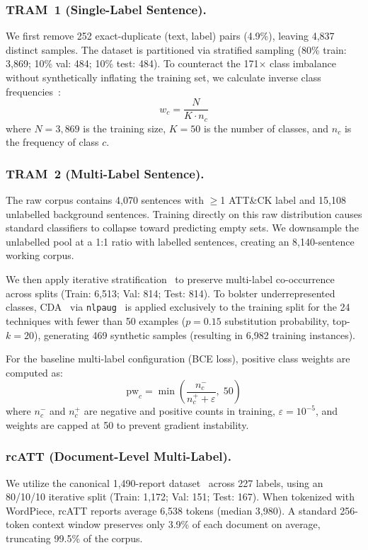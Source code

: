 \documentclass[runningheads]{llncs}
\begin{document}
\subsubsection{TRAM~1 (Single-Label Sentence).}
We first remove 252 exact-duplicate (text, label) pairs (4.9\%), leaving 4,837 distinct samples. The dataset is partitioned via stratified sampling (80\% train: 3,869; 10\% val: 484; 10\% test: 484). To counteract the 171$\times$ class imbalance without synthetically inflating the training set, we calculate inverse class frequencies~\cite{sklearn2011}:
\begin{equation}
  w_c = \frac{N}{K \cdot n_c}
  \label{eq:cw}
\end{equation}
where $N=3,869$ is the training size, $K=50$ is the number of classes, and $n_c$ is the frequency of class $c$.

\subsubsection{TRAM~2 (Multi-Label Sentence).}
The raw corpus contains 4,070 sentences with $\geq$1 ATT\&CK label and 15,108 unlabelled background sentences. Training directly on this raw distribution causes standard classifiers to collapse toward predicting empty sets. We downsample the unlabelled pool at a 1:1 ratio with labelled sentences, creating an 8,140-sentence working corpus. 

We then apply iterative stratification~\cite{sechidis2011} to preserve multi-label co-occurrence across splits (Train: 6,513; Val: 814; Test: 814). To bolster underrepresented classes, CDA~\cite{kobayashi2018contextual} via \texttt{nlpaug}~\cite{ma2019nlpaug} is applied exclusively to the training split for the 24 techniques with fewer than 50 examples ($p=0.15$ substitution probability, top-$k=20$), generating 469 synthetic samples (resulting in 6,982 training instances).

For the baseline multi-label configuration (BCE loss), positive class weights are computed as:
\begin{equation}
  \mathrm{pw}_c = \min\!\left(\frac{n_c^{-}}{n_c^{+} + \varepsilon},\; 50\right)
  \label{eq:pw}
\end{equation}
where $n_c^{-}$ and $n_c^{+}$ are negative and positive counts in training, $\varepsilon=10^{-5}$, and weights are capped at 50 to prevent gradient instability.

\subsubsection{rcATT (Document-Level Multi-Label).}
We utilize the canonical 1,490-report dataset~\cite{legoy2020rcatt} across 227 labels, using an 80/10/10 iterative split (Train: 1,172; Val: 151; Test: 167). When tokenized with WordPiece, rcATT reports average 6,538 tokens (median 3,980). A standard 256-token context window preserves only 3.9\% of each document on average, truncating 99.5\% of the corpus.
\end{document}
